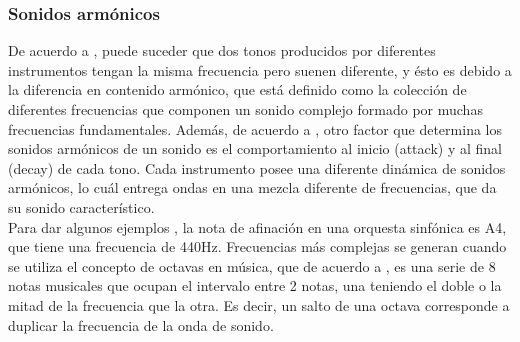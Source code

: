 \documentclass[12pt, letterpaper]{article}
\begin{document}
\subsubsection{Sonidos armónicos}

De acuerdo a \cite{university-physics}, puede suceder que dos tonos producidos por diferentes instrumentos tengan la 
misma frecuencia pero suenen diferente, y ésto es debido a la diferencia en contenido armónico, que está definido como la colección de diferentes frecuencias 
que componen un sonido complejo formado por muchas frecuencias fundamentales. Además, de acuerdo a \cite{university-physics}, otro factor que determina los 
sonidos armónicos de un sonido es el comportamiento al inicio (attack) y al final (decay) de cada tono. Cada instrumento posee una diferente dinámica de sonidos armónicos, 
lo cuál entrega ondas en una mezcla diferente de frecuencias, que da su sonido característico. \\

Para dar algunos ejemplos \cite{orchestra-frecuency}, la nota de afinación en una orquesta sinfónica es A4, que tiene una frecuencia de 440Hz. Frecuencias más complejas se generan cuando 
se utiliza el concepto de octavas en música, que de acuerdo a \cite{octave-definition}, es una serie de 8 notas musicales que ocupan el intervalo entre 2 notas, una teniendo el doble 
o la mitad de la frecuencia que la otra. Es decir, un salto de una octava corresponde a duplicar la frecuencia de la onda de sonido. 
\end{document}
